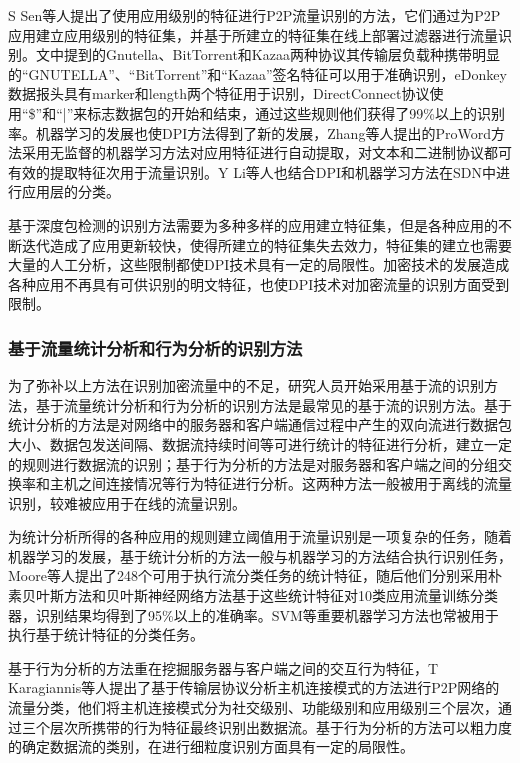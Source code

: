 S Sen等人提出了使用应用级别的特征进行P2P流量识别的方法，它们通过为P2P应用建立应用级别的特征集，并基于所建立的特征集在线上部署过滤器进行流量识别\supercite{18}。文中提到的Gnutella、BitTorrent和Kazaa两种协议其传输层负载种携带明显的“GNUTELLA”、“BitTorrent”和“Kazaa”签名特征可以用于准确识别，eDonkey数据报头具有marker和length两个特征用于识别，DirectConnect协议使用“\$”和“|”来标志数据包的开始和结束，通过这些规则他们获得了99\%以上的识别率。机器学习的发展也使DPI方法得到了新的发展，Zhang等人提出的ProWord方法采用无监督的机器学习方法对应用特征进行自动提取，对文本和二进制协议都可有效的提取特征次用于流量识别\supercite{dpi1}。Y Li等人也结合DPI和机器学习方法在SDN中进行应用层的分类\supercite{dpi2}。

基于深度包检测的识别方法需要为多种多样的应用建立特征集，但是各种应用的不断迭代造成了应用更新较快，使得所建立的特征集失去效力，特征集的建立也需要大量的人工分析，这些限制都使DPI技术具有一定的局限性。加密技术的发展造成各种应用不再具有可供识别的明文特征，也使DPI技术对加密流量的识别方面受到限制。


\subsubsection{基于流量统计分析和行为分析的识别方法}
为了弥补以上方法在识别加密流量中的不足，研究人员开始采用基于流的识别方法，基于流量统计分析和行为分析的识别方法是最常见的基于流的识别方法。基于统计分析的方法是对网络中的服务器和客户端通信过程中产生的双向流进行数据包大小、数据包发送间隔、数据流持续时间等可进行统计的特征进行分析，建立一定的规则进行数据流的识别；基于行为分析的方法是对服务器和客户端之间的分组交换率和主机之间连接情况等行为特征进行分析。这两种方法一般被用于离线的流量识别，较难被应用于在线的流量识别。

为统计分析所得的各种应用的规则建立阈值用于流量识别是一项复杂的任务，随着机器学习的发展，基于统计分析的方法一般与机器学习的方法结合执行识别任务，Moore等人提出了248个可用于执行流分类任务的统计特征\supercite{statistic1}，随后他们分别采用朴素贝叶斯方法和贝叶斯神经网络方法基于这些统计特征对10类应用流量训练分类器\supercite{statistic2,statistic3}，识别结果均得到了95\%以上的准确率。SVM等重要机器学习方法也常被用于执行基于统计特征的分类任务\supercite{statistic4,statistic5}。

基于行为分析的方法重在挖掘服务器与客户端之间的交互行为特征，T Karagiannis等人提出了基于传输层协议分析主机连接模式的方法进行P2P网络的流量分类，他们将主机连接模式分为社交级别、功能级别和应用级别三个层次，通过三个层次所携带的行为特征最终识别出数据流\supercite{behavior1,behavior2}。基于行为分析的方法可以粗力度的确定数据流的类别，在进行细粒度识别方面具有一定的局限性。

